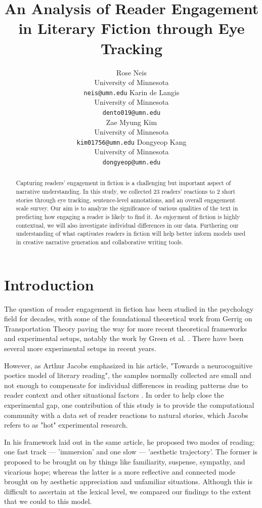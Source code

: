 \documentclass[11pt]{article}
\title{An Analysis of Reader Engagement in Literary Fiction through Eye Tracking}
\author{Rose Neis \\
  University of Minnesota  \\
  \texttt{neis@umn.edu}
  \And
  Karin de Langis \\
  University of Minnesota\\
  \texttt{dento019@umn.edu} \\
  \AND
  Zae Myung Kim \\
  University of Minnesota\\
  \texttt{kim01756@umn.edu}
  \And
  Dongyeop Kang \\
  University of Minnesota\\
  \texttt{dongyeop@umn.edu} \\
  }
\begin{document}
\maketitle

\begin{abstract}
Capturing readers' engagement in fiction is a challenging but important aspect of narrative understanding. In this study, we collected 23 readers’ reactions to 2 short stories through eye tracking, sentence-level annotations, and an overall engagement scale survey. Our aim is to analyze the significance of various qualities of the text in predicting how engaging a reader is likely to find it. As enjoyment of fiction is highly contextual, we will also investigate individual differences in our data. Furthering our understanding of what captivates readers in fiction will help better inform models used in creative narrative generation and collaborative writing tools.
\end{abstract}
\section{Introduction}
The question of reader engagement in fiction has been studied in the psychology field for decades, with some of the foundational theoretical work from Gerrig on Transportation Theory \citep{gerrig_1993} paving the way for more recent theoretical frameworks and experimental setups, notably the work by Green et al. \citep{Green2004,green_brock_kaufman_2006}. There have been several more experimental setups in recent years. 

However, as Arthur Jacobs emphasized in his article, "Towards a neurocognitive poetics model of literary reading", the samples normally collected are small and not enough to compensate for individual differences in reading patterns due to reader context and other situational factors \citep{willems_2015}. In order to help close the experimental gap, one contribution of this study is to provide the computational community with a data set of reader reactions to natural stories, which Jacobs refers to as "hot" experimental research.

In his framework laid out in the same article, he proposed two modes of reading: one fast track --- 'immersion' and one slow --- 'aesthetic trajectory'. The former is proposed to be brought on by things like familiarity, suspense, sympathy, and vicarious hope; whereas the latter is a more reflective and connected mode brought on by aesthetic appreciation and unfamiliar situations. Although this is difficult to ascertain at the lexical level, we compared our findings to the extent that we could to this model.
\end{document}
